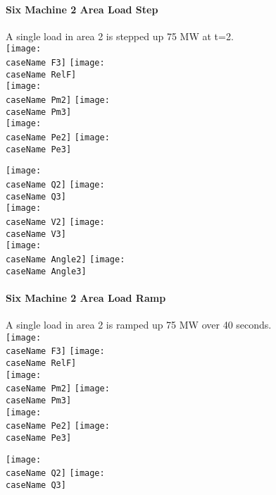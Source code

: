 \documentclass[12pt]{article}
\newcommand{\caseName}{ }
\begin{document}
\renewcommand{\caseName}{SixMachineStep1}
\paragraph{Six Machine 2 Area Load Step} A single load in area 2 is stepped up 75 MW at t=2.\\

	\texttt{[image: \\caseName F3]} %
	\texttt{[image: \\caseName RelF]} \\

	\texttt{[image: \\caseName Pm2]} %
	\texttt{[image: \\caseName Pm3]} \\

	\texttt{[image: \\caseName Pe2]} %
	\texttt{[image: \\caseName Pe3]} 
	
\pagebreak

	\texttt{[image: \\caseName Q2]} %
	\texttt{[image: \\caseName Q3]} \\

	\texttt{[image: \\caseName V2]} %
	\texttt{[image: \\caseName V3]} \\

	\texttt{[image: \\caseName Angle2]} %
	\texttt{[image: \\caseName Angle3]} 

\pagebreak
\renewcommand{\caseName}{SixMachineRamp1}
\paragraph{Six Machine 2 Area  Load Ramp} A single load in area 2 is ramped up 75 MW over 40 seconds.\\

	\texttt{[image: \\caseName F3]} %
	\texttt{[image: \\caseName RelF]} \\

	\texttt{[image: \\caseName Pm2]} %
	\texttt{[image: \\caseName Pm3]} \\

	\texttt{[image: \\caseName Pe2]} %
	\texttt{[image: \\caseName Pe3]} 
	
\pagebreak

	\texttt{[image: \\caseName Q2]} %
	\texttt{[image: \\caseName Q3]} \\
\end{document}
